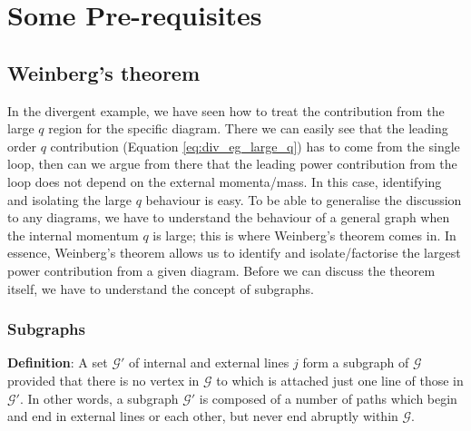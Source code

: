 \documentclass{article}
\begin{document}
\section{Some Pre-requisites} \label{prerequesites}
\subsection{Weinberg's theorem}
In the divergent example, we have seen how to treat the contribution from the large $q$ region for the specific diagram. There we can easily see that the leading order $q$ contribution (Equation \ref{eq:div_eg_large_q}) has to come from the single loop, then can we argue from there that the leading power contribution from the loop does not depend on the external momenta/mass. In this case, identifying and isolating the large $q$ behaviour is easy. To be able to generalise the discussion to any diagrams, we have to understand the behaviour of a general graph when the internal momentum $q$ is large; this is where Weinberg's theorem \cite{weinberg} comes in. In essence, Weinberg's theorem allows us to identify and isolate/factorise the largest power contribution from a given diagram. Before we can discuss the theorem itself, we have to understand the concept of subgraphs.\\



\subsubsection{Subgraphs}
\textbf{Definition}: A set $\mathcal{G'}$ of internal and external lines $j$ form a subgraph of $\mathcal{G}$ provided that there is no vertex in $\mathcal{G}$ to which is attached just one line of those in $\mathcal{G'}$. In other words, a subgraph $\mathcal{G'}$ is composed of a number of paths which begin and end in external lines or each other, but never end abruptly within $\mathcal{G}$. 
\end{document}
